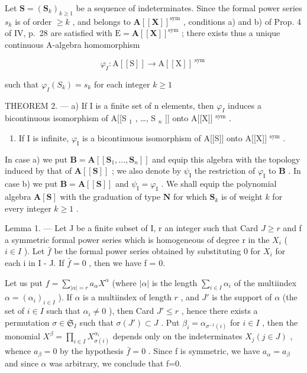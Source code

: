 Let \(\mathbf{S} = (\mathbf{S}_k)_{k\geqslant 1}\) be a sequence of indeterminates. Since the formal power series \(s_k\) is of order \(\geqslant k\) , and belongs to \(\mathbf{A}[[\mathbf{X}]]^{\mathrm{sym}}\) , conditions a) and b) of Prop. 4 of IV, p.~28 are satisfied with \(\mathrm{E} = \mathbf{A}[[\mathbf{X}]]^{\mathrm{sym}}\) ; there exists thus a unique continuous A-algebra homomorphism

\[
\varphi_ {I}: \mathrm{A} [ [ \mathrm{S} ] ] \rightarrow \mathrm{A} [ [ \mathrm{X} ] ] ^ {\text { sym }}
\]

such that \(\varphi_{I}(S_{k}) = s_{k}\) for each integer \(k\geqslant 1\)

THEOREM 2. --- a) If I is a finite set of n elements, then \(\varphi_{I}\) induces a bicontinuous isomorphism of A{[}{[}S \(_{1}\) , \ldots, S \(_{n}\) {]}{]} onto A{[}{[}X{]}{]} \(^{\text{sym}}\) .

\begin{enumerate}
\def\labelenumi{\alph{enumi})}
\setcounter{enumi}{1}
\tightlist
\item
  If I is infinite, \(\varphi_{\mathrm{I}}\) is a bicontinuous isomorphism of A{[}{[}S{]}{]} onto A{[}{[}X{]}{]} \(^{\mathrm{sym}}\) .
\end{enumerate}

In case a) we put \(\mathbf{B} = \mathbf{A}[[\mathbf{S}_1, \ldots, \mathbf{S}_n]]\) and equip this algebra with the topology induced by that of \(\mathbf{A}[[\mathbf{S}]]\) ; we also denote by \(\psi_{\mathrm{I}}\) the restriction of \(\varphi_{\mathrm{I}}\) to \(\mathbf{B}\) . In case b) we put \(\mathbf{B} = \mathbf{A}[[\mathbf{S}]]\) and \(\psi_{\mathrm{I}} = \varphi_{\mathrm{I}}\) . We shall equip the polynomial algebra \(\mathbf{A}[\mathbf{S}]\) with the graduation of type \(\mathbf{N}\) for which \(\mathbf{S}_k\) is of weight \(k\) for every integer \(k \geqslant 1\) .

Lemma 1. --- Let J be a finite subset of I, r an integer such that Card \(J \geqslant r\) and f a symmetric formal power series which is homogeneous of degree r in the \(X_{i}\) ( \(i \in I\) ). Let \(\bar{f}\) be the formal power series obtained by substituting 0 for \(X_{i}\) for each i in I - J. If \(\bar{f} = 0\) , then we have f = 0.

Let us put \(f = \sum_{|\alpha| = r} a_{\alpha} X^{\alpha}\) (where \(|\alpha|\) is the length \(\sum_{i \in I} \alpha_i\) of the multiindex \(\alpha = (\alpha_i)_{i \in I}\) ). If \(\alpha\) is a multiindex of length \(r\) , and \(J'\) is the support of \(\alpha\) (the set of \(i \in I\) such that \(\alpha_i \neq 0\) ), then Card \(J' \leqslant r\) , hence there exists a permutation \(\sigma \in \mathfrak{S}_I\) such that \(\sigma(J') \subset J\) . Put \(\beta_i = \alpha_{\sigma^{-1}(i)}\) for \(i \in I\) , then the monomial \(X^\beta = \prod_{i \in I} X_{\sigma(i)}^{\alpha_i}\) depends only on the indeterminates \(X_j (j \in J)\) , whence \(a_\beta = 0\) by the hypothesis \(\bar{f}=0\) . Since f is symmetric, we have \(a_{\alpha}=a_{\beta}\) and since \(\alpha\) was arbitrary, we conclude that f=0.

